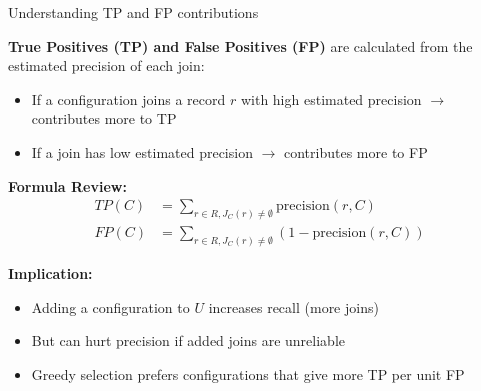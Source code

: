 \documentclass[8pt]{beamer} %
\begin{document}
\begin{frame}{Understanding TP and FP contributions}
	
	\textbf{True Positives (TP) and False Positives (FP)} are calculated from the estimated precision of each join:
	
	\vspace{0.5em}
	\begin{itemize}
		\item If a configuration joins a record $r$ with high estimated precision $\rightarrow$ contributes more to TP
		\item If a join has low estimated precision $\rightarrow$ contributes more to FP
	\end{itemize}
	
	\vspace{0.5em}
	\textbf{Formula Review:}
	\begin{align*}
		TP(C) &= \sum_{r \in R, J_C(r) \neq \emptyset} \text{precision}(r, C) \\
		FP(C) &= \sum_{r \in R, J_C(r) \neq \emptyset} \left(1 - \text{precision}(r, C)\right)
	\end{align*}
	
	\vspace{0.5em}
	\textbf{Implication:}
	\begin{itemize}
		\item Adding a configuration to $U$ increases recall (more joins)
		\item But can hurt precision if added joins are unreliable
		\item Greedy selection prefers configurations that give more TP per unit FP
	\end{itemize}
\end{frame}
\end{document}
